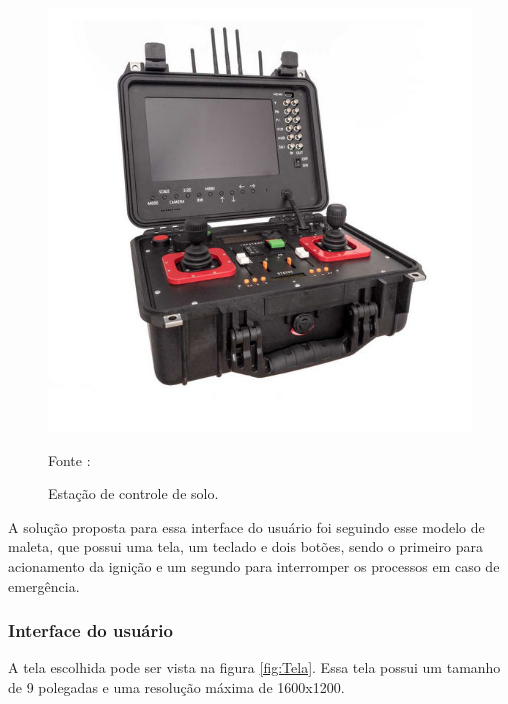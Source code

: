 \begin{figure}[H]
  \centering
  \includegraphics[scale=0.9]{figuras/DroneGroundStation.jpg}
  \caption{Estação de controle de solo.}
  {\footnotesize Fonte : \cite{AeroExpo}} 
  \label{fig:DroneStation}
\end{figure}


A solução proposta para essa interface do usuário foi seguindo esse modelo de maleta, que possui uma tela, um teclado e dois botões, sendo o primeiro para acionamento da ignição e um segundo para interromper os processos em caso de emergência.

\subsubsection{Interface do usuário}

A tela escolhida pode ser vista na figura \ref{fig:Tela}. Essa tela possui um tamanho de 9 polegadas e uma resolução máxima de 1600x1200. 



